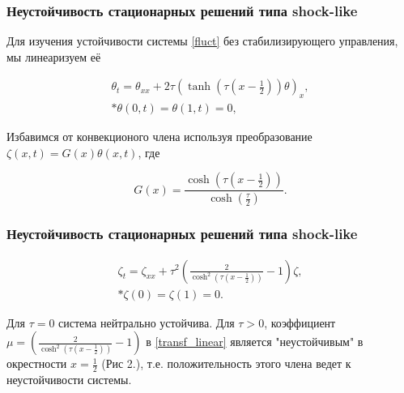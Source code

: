 \documentclass{beamer}
\begin{document}
\begin{frame}
\frametitle{Неустойчивость стационарных решений типа shock-like}

Для изучения устойчивости системы \eqref{fluct} без стабилизирующего управления, 
мы линеаризуем её

\begin{block}{}
\begin{gather}\label{linearized}
    \theta_t = \theta_{xx} + 2 \tau (\tanh(\tau(x - \frac{1}{2}))\theta)_x, \\*
    \theta(0, t) = \theta(1, t) = 0,
\end{gather}
\end{block}

Избавимся от конвекционого члена используя преобразование 
$\zeta(x, t) = G(x)\theta(x, t)$, где 

\begin{block}{}
\begin{equation}
    G(x) = \frac{\cosh(\tau(x - \frac{1}{2}))}{\cosh(\frac{\tau}{2})}.
\end{equation}
\end{block}

\end{frame}

\begin{frame}
\frametitle{Неустойчивость стационарных решений типа shock-like}

\begin{block}{}
\begin{gather} \label{transf_linear}
    \zeta_t = \zeta_{xx} + \tau^2 \left( \frac{2}{\cosh^2(\tau(x -
    \frac{1}{2}))} - 1 \right) \zeta, \\* 
    \zeta(0) = \zeta(1) = 0.
\end{gather}
\end{block}
Для $\tau = 0$ система нейтрально устойчива. Для $\tau > 0$, коэффициент 
$\mu = \left(\frac{2}{\cosh^2(\tau(x - \frac{1}{2}))} - 1 \right)$  в 
\eqref{transf_linear} является "неустойчивым" в окрестности 
$x = \frac{1}{2}$ (Рис 2.), т.е. положительность этого члена ведет к
неустойчивости системы.

\end{frame}
\end{document}
